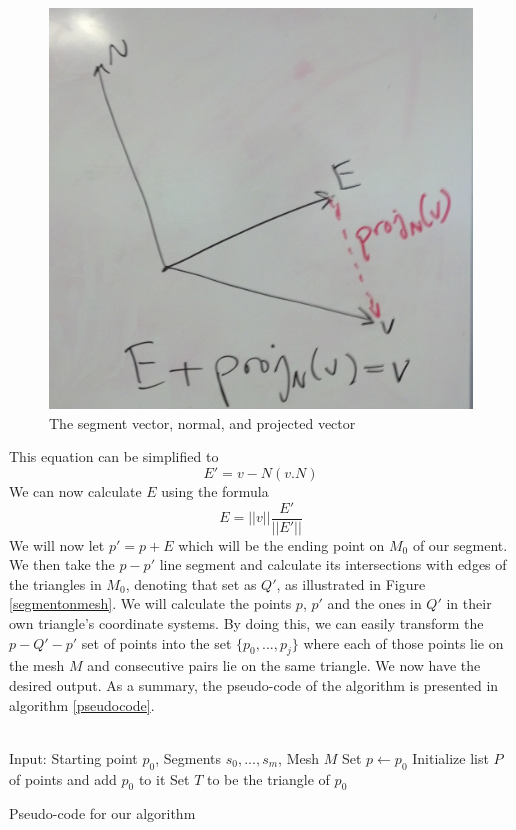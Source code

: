 \begin{figure}[ht]
\centering
\includegraphics[width=\columnwidth]{vectordiagram.jpg}
\caption{The segment vector, normal, and projected vector}
\label{vectordiagram}
\end{figure}

This equation can be simplified to
\[
E' = v - N(v.N)
\]
We can now calculate $E$ using the formula
\[
E = ||v|| \frac{E'}{||E'||}
\]
We will now let $p' = p+E$ which will be the ending point on $M_0$ of our segment. We then take the $p-p'$ line segment and calculate its intersections with edges of the triangles in $M_0$, denoting that set as $Q'$, as illustrated in Figure \ref{segmentonmesh}. We will calculate the points $p$, $p'$ and the ones in $Q'$ in their own triangle's coordinate systems. By doing this, we can easily transform the $p-Q'-p'$ set of points into the set $\{p_0,...,p_j\}$ where each of those points lie on the mesh $M$ and consecutive pairs lie on the same triangle. We now have the desired output. As a summary, the pseudo-code of the algorithm is presented in algorithm \ref{pseudocode}. \\
\\
\begin{algorithm}[t]
Input: Starting point $p_0$, Segments $s_0,...,s_m$, Mesh $M$\;
Set $p \leftarrow p_0$ \;
Initialize list $P$ of points and add $p_0$ to it \;
Set $T$ to be the triangle of $p_0$ \;
\caption{Pseudo-code for our algorithm}
\label{pseudocode}
\end{algorithm}

